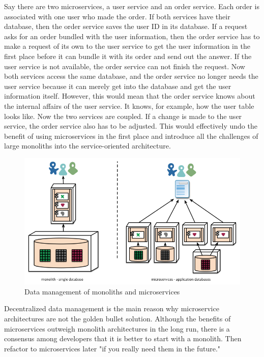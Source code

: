Say there are two microservices, a user service and an order service. Each order is associated with one user who made the order. If both services have their database, then the order service saves the user ID in its database. If a request asks for an order bundled with the user information, then the order service has to make a request of its own to the user service to get the user information in the first place before it can bundle it with its order and send out the answer. If the user service is not available, the order service can not finish the request. Now both services access the same database, and the order service no longer needs the user service because it can merely get into the database and get the user information itself. However, this would mean that the order service knows about the internal affairs of the user service. It knows, for example, how the user table looks like. Now the two services are coupled. If a change is made to the user service, the order service also has to be adjusted. This would effectively undo the benefit of using microservices in the first place and introduce all the challenges of large monoliths into the service-oriented architecture.

\begin{figure}[ht]
  \centering
  \includegraphics[width=0.7\linewidth]{assets/decentralised-data.png}
  \caption{Data management of monoliths and microservices}
  \label{fig:decentralised-data}
\end{figure}

Decentralized data management is the main reason why microservice architectures are not the golden bullet solution. Although the benefits of microservices outweigh monolith architectures in the long run, there is a consensus among developers that it is better to start with a monolith. Then refactor to microservices later "if you really need them in the future." ~\cite{krivtsov.2019}


